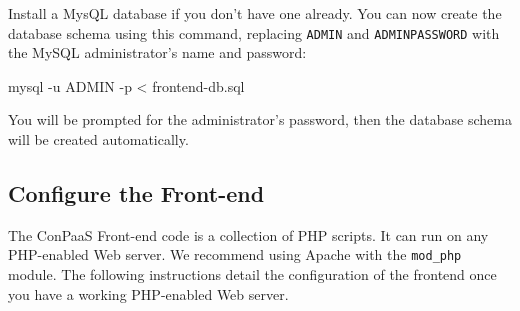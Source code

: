 \documentclass[10pt]{article}
\begin{document}
Install a MysQL database if you don't have one already. You can now
create the database schema using this command, replacing \verb+ADMIN+
and \verb+ADMINPASSWORD+ with the MySQL administrator's name and
password:

\begin{code}
  mysql -u ADMIN -p < frontend-db.sql
\end{code}


You will be prompted for the administrator's password, then the
database schema will be created automatically.

\subsection{Configure the Front-end}

The ConPaaS Front-end code is a collection of PHP scripts. It can run
on any PHP-enabled Web server. We recommend using Apache with the
\verb+mod_php+ module. The following instructions detail the
configuration of the frontend once you have a working PHP-enabled Web
server.
\end{document}
